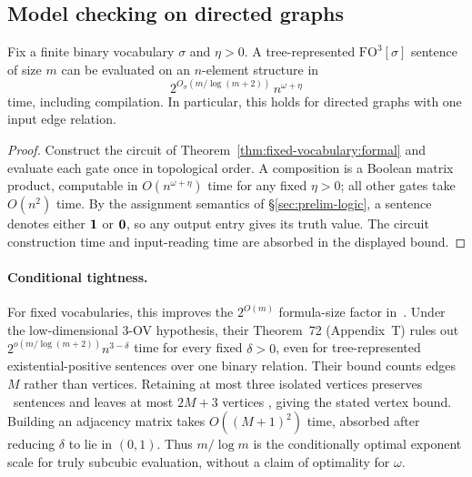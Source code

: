 \subsection{Model checking on directed graphs}\label{sec:fixed-model-checking}
\begin{corollary}\label{cor:fixed-model-checking}
Fix a finite binary vocabulary $\sigma$ and $\eta>0$.
A tree-represented $\mathrm{FO}^3[\sigma]$ sentence of size $m$ can be
evaluated on an $n$-element structure in
\[
 2^{O_\sigma(m/\log(m+2))}\,n^{\omega+\eta}
\]
time, including compilation. In particular, this holds for directed
graphs with one input edge relation.
\end{corollary}
\begin{proof}
Construct the circuit of Theorem~\ref{thm:fixed-vocabulary:formal} and evaluate
each gate once in topological order.
A composition is a Boolean matrix product, computable in
$O(n^{\omega+\eta})$ time for any fixed $\eta>0$; all other gates take
$O(n^2)$ time. By the assignment semantics of \S\ref{sec:prelim-logic}, a
sentence denotes either $\mathbf{1}$ or $\mathbf{0}$, so any output entry
gives its truth value.
The circuit construction time and input-reading time are absorbed
in the displayed bound.
\end{proof}

\paragraph{Conditional tightness.}
For fixed vocabularies, this improves the $2^{O(m)}$ formula-size
factor in~\citep[Theorem~10]{nakamura-uezato2027}.
Under the low-dimensional 3-OV hypothesis, their Theorem~72
(Appendix~T) rules out $2^{o(m/\log(m+2))}n^{3-\delta}$ time
for every fixed $\delta>0$, even for tree-represented
existential-positive sentences over one binary relation.
Their bound counts edges $M$ rather than vertices.
Retaining at most three isolated vertices preserves \FOthree\
sentences and leaves at most $2M+3$ vertices
\citep[Proposition~6]{nakamura-uezato2027}, giving the stated vertex
bound. Building an adjacency matrix takes $O((M+1)^2)$ time,
absorbed after reducing $\delta$ to lie in $(0,1)$.
Thus $m/\log m$ is the conditionally optimal exponent scale for
truly subcubic evaluation, without a claim of optimality for $\omega$.
